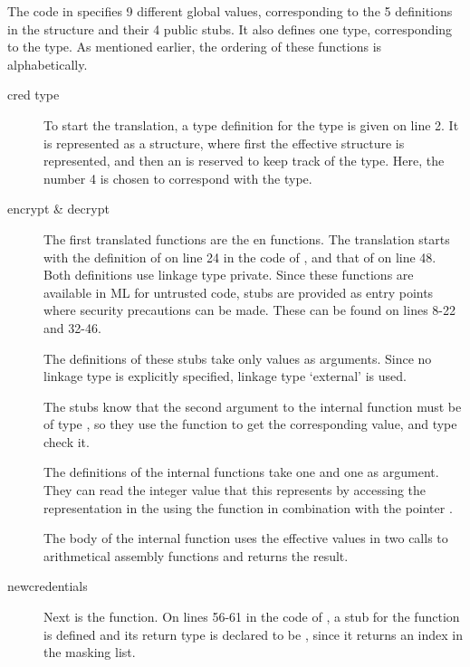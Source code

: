The code in  specifies 9 different global values, corresponding to the 5 definitions in the  structure and their 4 public stubs. It also defines one type, corresponding to the  type.
As mentioned earlier, the ordering of these functions is alphabetically.
\begin{description}
\item[cred type] To start the translation, a type definition for the  type is given on line 2.
It is represented as a structure, where first the effective structure is represented, and then an  is reserved to keep track of the type.
Here, the number 4 is chosen to correspond with the  type.

\item[encrypt \& decrypt] The first translated functions are the  en  functions. The translation starts with the definition of  on line 24 in the code of , and that of  on line 48.
Both definitions use linkage type private.
Since these functions are available in ML for untrusted code, stubs are provided as entry points where security precautions can be made. These can be found on lines 8-22 and 32-46.

The definitions of these stubs take only  values as arguments.
Since no linkage type is explicitly specified, linkage type `external'  is used.

The stubs know that the second argument to the internal function must be of type , so they use the  function to get the corresponding  value, and type check it.

The definitions of the internal functions take one  and one  as argument.
They can read the integer value that this  represents by accessing the representation in the using the  function in combination with the pointer .

The body of the internal function uses the effective values in two calls to arithmetical assembly functions and returns the result.

\item[newcredentials] Next is the  function.
On lines 56-61 in the code of , a stub for the function is defined and its return type is declared to be , since it returns an index in the masking list.


\end{description}
